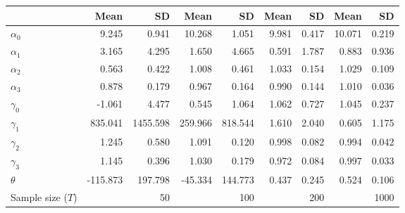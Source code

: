 
\begin{tabular}[t]{lrrrrrrrr}
\toprule
  & Mean & SD & Mean  & SD  & Mean   & SD   & Mean    & SD   \\
\midrule
$\alpha_{0}$ & 9.245 & 0.941 & 10.268 & 1.051 & 9.981 & 0.417 & 10.071 & 0.219\\
$\alpha_{1}$ & 3.165 & 4.295 & 1.650 & 4.665 & 0.591 & 1.787 & 0.883 & 0.936\\
$\alpha_{2}$ & 0.563 & 0.422 & 1.008 & 0.461 & 1.033 & 0.154 & 1.029 & 0.109\\
$\alpha_{3}$ & 0.878 & 0.179 & 0.967 & 0.164 & 0.990 & 0.144 & 1.010 & 0.036\\
$\gamma_{0}$ & -1.061 & 4.477 & 0.545 & 1.064 & 1.062 & 0.727 & 1.045 & 0.237\\
$\gamma_{1}$ & 835.041 & 1455.598 & 259.966 & 818.544 & 1.610 & 2.040 & 0.605 & 1.175\\
$\gamma_{2}$ & 1.245 & 0.580 & 1.091 & 0.120 & 0.998 & 0.082 & 0.994 & 0.042\\
$\gamma_{3}$ & 1.145 & 0.396 & 1.030 & 0.179 & 0.972 & 0.084 & 0.997 & 0.033\\
$\theta$ & -115.873 & 197.798 & -45.334 & 144.773 & 0.437 & 0.245 & 0.524 & 0.106\\
Sample size ($T$) &  & 50 &  & 100 &  & 200 &  & 1000\\
\bottomrule
\end{tabular}
